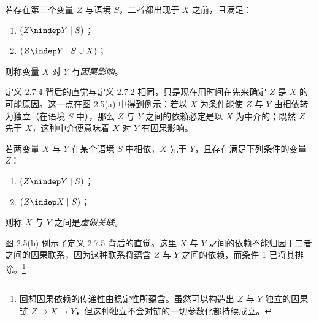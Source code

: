 \begin{definition}[带时间信息的真正因果]
若存在第三个变量 $Z$ 与语境 $S$，二者都出现于 $X$ 之前，且满足：
\begin{enumerate}[label=\arabic*.,leftmargin=1.8em]
\item $(Z\nindep Y\mid S)$；
\item $(Z\indep Y\mid S\cup X)$；
\end{enumerate}
则称变量 $X$ 对 $Y$ 有\emph{因果影响}。
\end{definition}

定义 2.7.4 背后的直觉与定义 2.7.2 相同，只是现在用时间在先来确定 $Z$ 是 $X$ 的可能原因。这一点在图 2.5(a) 中得到例示：若以 $X$ 为条件能使 $Z$ 与 $Y$ 由相依转为独立（在语境 $S$ 中），那么 $Z$ 与 $Y$ 之间的依赖必定是以 $X$ 为中介的；既然 $Z$ 先于 $X$，这种中介便意味着 $X$ 对 $Y$ 有因果影响。

\begin{definition}[带时间信息的虚假关联]
若两变量 $X$ 与 $Y$ 在某个语境 $S$ 中相依，$X$ 先于 $Y$，且存在满足下列条件的变量 $Z$：
\begin{enumerate}[label=\arabic*.,leftmargin=1.8em]
\item $(Z\nindep Y\mid S)$；
\item $(Z\indep X\mid S)$；
\end{enumerate}
则称 $X$ 与 $Y$ 之间是\emph{虚假关联}。
\end{definition}

图 2.5(b) 例示了定义 2.7.5 背后的直觉。这里 $X$ 与 $Y$ 之间的依赖不能归因于二者之间的因果联系，因为这种联系将蕴含 $Z$ 与 $Y$ 之间的依赖，而条件 1 已将其排除。\footnote{回想因果依赖的传递性由稳定性所蕴含。虽然可以构造出 $Z$ 与 $Y$ 独立的因果链 $Z\to X\to Y$，但这种独立不会对链的一切参数化都持续成立。}

